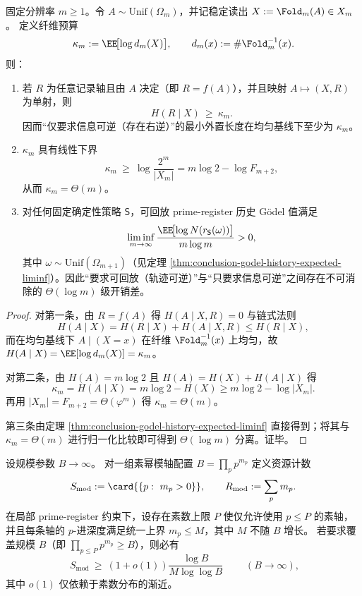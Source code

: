 \begin{theorem}\label{thm:conclusion-godel-vs-minimal-gap}
固定分辨率 \(m\ge 1\)。令 \(A\sim\mathrm{Unif}(\Omega_m)\)，并记稳定读出 \(X:=\Fold_m(A)\in X_m\)。
定义纤维预算
\[
\kappa_m:=\EE\!\bigl[\log d_m(X)\bigr],
\qquad d_m(x):=\#\Fold_m^{-1}(x).
\]
则：
\begin{enumerate}
  \item 若 \(R\) 为任意记录轴且由 \(A\) 决定（即 \(R=f(A)\)），并且映射 \(A\mapsto(X,R)\) 为单射，则
  \[
  H(R\mid X)\ \ge\ \kappa_m.
  \]
  因而“仅要求信息可逆（存在右逆）”的最小外置长度在均匀基线下至少为 \(\kappa_m\)。
  \item \(\kappa_m\) 具有线性下界
  \[
  \kappa_m\ \ge\ \log\frac{2^m}{|X_m|}
  =m\log 2-\log F_{m+2},
  \]
  从而 \(\kappa_m=\Theta(m)\)。
  \item 对任何固定确定性策略 \(\mathsf S\)，可回放 prime-register 历史 Gödel 值满足
  \[
  \liminf_{m\to\infty}\frac{\EE\!\bigl[\log N(r_{\mathsf S}(\omega))\bigr]}{m\log m}>0,
  \]
  其中 \(\omega\sim\mathrm{Unif}(\Omega_{m+1})\)（见定理 \ref{thm:conclusion-godel-history-expected-liminf}）。因此“要求可回放（轨迹可逆）”与“只要求信息可逆”之间存在不可消除的 \(\Theta(\log m)\) 级开销差。
\end{enumerate}
\end{theorem}
\begin{proof}
对第一条，由 \(R=f(A)\) 得 \(H(A\mid X,R)=0\) 与链式法则
\[
H(A\mid X)=H(R\mid X)+H(A\mid X,R)\le H(R\mid X),
\]
而在均匀基线下 \(A\mid(X=x)\) 在纤维 \(\Fold_m^{-1}(x)\) 上均匀，故
\(
H(A\mid X)=\EE[\log d_m(X)]=\kappa_m
\)。
\par
对第二条，由 \(H(A)=m\log 2\) 且 \(H(A)=H(X)+H(A\mid X)\) 得
\[
\kappa_m=H(A\mid X)=m\log 2-H(X)\ge m\log 2-\log|X_m|.
\]
再用 \(|X_m|=F_{m+2}=\Theta(\varphi^m)\) 得 \(\kappa_m=\Theta(m)\)。
\par
第三条由定理 \ref{thm:conclusion-godel-history-expected-liminf} 直接得到；将其与 \(\kappa_m=\Theta(m)\) 进行归一化比较即可得到 \(\Theta(\log m)\) 分离。证毕。
\end{proof}

\begin{theorem}\label{thm:conclusion-crt-parallel-prime-register-locality-axis-lb}
设规模参数 \(B\to\infty\)。
对一组素幂模轴配置 \(B=\prod_p p^{m_p}\) 定义资源计数
\[
S_{\mathrm{mod}}:=\card{\{p:\ m_p>0\}},
\qquad
R_{\mathrm{mod}}:=\sum_p m_p.
\]
在局部 prime-register 约束下，设存在素数上限 \(P\) 使仅允许使用 \(p\le P\) 的素轴，并且每条轴的 \(p\)-进深度满足统一上界 \(m_p\le M\)，其中 \(M\) 不随 \(B\) 增长。
若要求覆盖规模 \(B\)（即 \(\prod_{p\le P}p^{m_p}\ge B\)），则必有
\[
\boxed{\;
S_{\mathrm{mod}}
\ \ge\
\left(1+o(1)\right)\frac{\log B}{M\log\log B}\;}
\qquad(B\to\infty),
\]
其中 \(o(1)\) 仅依赖于素数分布的渐近。
\end{theorem}

